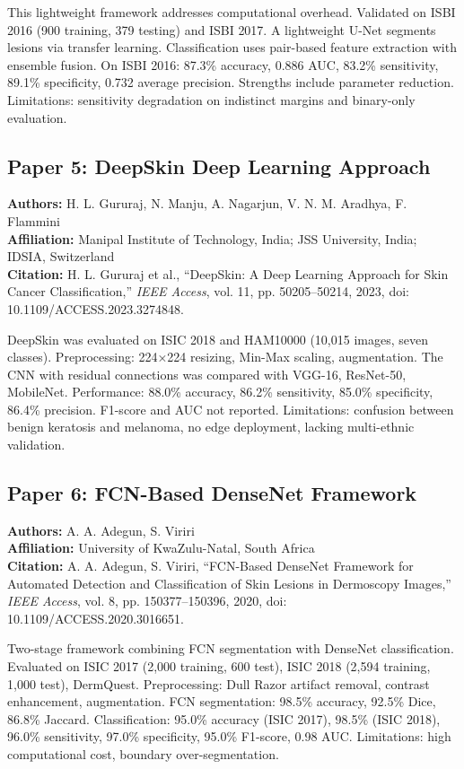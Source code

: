\documentclass[conference]{IEEEtran}
\begin{document}
This lightweight framework addresses computational overhead. Validated on ISBI 2016 (900 training, 379 testing) and ISBI 2017. A lightweight U-Net segments lesions via transfer learning. Classification uses pair-based feature extraction with ensemble fusion. On ISBI 2016: 87.3\% accuracy, 0.886 AUC, 83.2\% sensitivity, 89.1\% specificity, 0.732 average precision. Strengths include parameter reduction. Limitations: sensitivity degradation on indistinct margins and binary-only evaluation.

\subsection{Paper 5: DeepSkin Deep Learning Approach}

\noindent\textbf{Authors:} H. L. Gururaj, N. Manju, A. Nagarjun, V. N. M. Aradhya, F. Flammini\\
\textbf{Affiliation:} Manipal Institute of Technology, India; JSS University, India; IDSIA, Switzerland\\
\textbf{Citation:} H. L. Gururaj et al., ``DeepSkin: A Deep Learning Approach for Skin Cancer Classification,'' \textit{IEEE Access}, vol. 11, pp. 50205--50214, 2023, doi: 10.1109/ACCESS.2023.3274848.

DeepSkin was evaluated on ISIC 2018 and HAM10000 (10,015 images, seven classes). Preprocessing: 224×224 resizing, Min-Max scaling, augmentation. The CNN with residual connections was compared with VGG-16, ResNet-50, MobileNet. Performance: 88.0\% accuracy, 86.2\% sensitivity, 85.0\% specificity, 86.4\% precision. F1-score and AUC not reported. Limitations: confusion between benign keratosis and melanoma, no edge deployment, lacking multi-ethnic validation.

\subsection{Paper 6: FCN-Based DenseNet Framework}

\noindent\textbf{Authors:} A. A. Adegun, S. Viriri\\
\textbf{Affiliation:} University of KwaZulu-Natal, South Africa\\
\textbf{Citation:} A. A. Adegun, S. Viriri, ``FCN-Based DenseNet Framework for Automated Detection and Classification of Skin Lesions in Dermoscopy Images,'' \textit{IEEE Access}, vol. 8, pp. 150377--150396, 2020, doi: 10.1109/ACCESS.2020.3016651.

Two-stage framework combining FCN segmentation with DenseNet classification. Evaluated on ISIC 2017 (2,000 training, 600 test), ISIC 2018 (2,594 training, 1,000 test), DermQuest. Preprocessing: Dull Razor artifact removal, contrast enhancement, augmentation. FCN segmentation: 98.5\% accuracy, 92.5\% Dice, 86.8\% Jaccard. Classification: 95.0\% accuracy (ISIC 2017), 98.5\% (ISIC 2018), 96.0\% sensitivity, 97.0\% specificity, 95.0\% F1-score, 0.98 AUC. Limitations: high computational cost, boundary over-segmentation.
\end{document}
